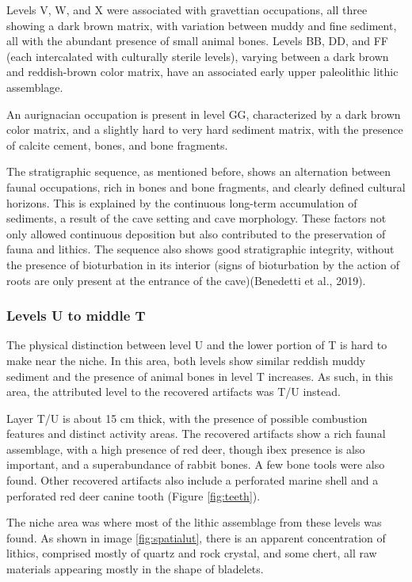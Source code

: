 \documentclass[12pt,twoside]{reedthesis}
\begin{document}
Levels V, W, and X were associated with gravettian occupations, all three showing a dark brown matrix, with variation between muddy and fine sediment, all with the abundant presence of small animal bones. Levels BB, DD, and FF (each intercalated with culturally sterile levels), varying between a dark brown and reddish-brown color matrix, have an associated early upper paleolithic lithic assemblage.

An aurignacian occupation is present in level GG, characterized by a dark brown color matrix, and a slightly hard to very hard sediment matrix, with the presence of calcite cement, bones, and bone fragments.

The stratigraphic sequence, as mentioned before, shows an alternation between faunal occupations, rich in bones and bone fragments, and clearly defined cultural horizons. This is explained by the continuous long-term accumulation of sediments, a result of the cave setting and cave morphology. These factors not only allowed continuous deposition but also contributed to the preservation of fauna and lithics. The sequence also shows good stratigraphic integrity, without the presence of bioturbation in its interior (signs of bioturbation by the action of roots are only present at the entrance of the cave)(Benedetti et al., 2019).

\hypertarget{levels-u-to-middle-t}{%
\subsubsection{Levels U to middle T}\label{levels-u-to-middle-t}}

The physical distinction between level U and the lower portion of T is hard to make near the niche. In this area, both levels show similar reddish muddy sediment and the presence of animal bones in level T increases. As such, in this area, the attributed level to the recovered artifacts was T/U instead.

Layer T/U is about 15 cm thick, with the presence of possible combustion features and distinct activity areas. The recovered artifacts show a rich faunal assemblage, with a high presence of red deer, though ibex presence is also important, and a superabundance of rabbit bones. A few bone tools were also found. Other recovered artifacts also include a perforated marine shell and a perforated red deer canine tooth (Figure \ref{fig:teeth}).

The niche area was where most of the lithic assemblage from these levels was found. As shown in image \ref{fig:spatialut}, there is an apparent concentration of lithics, comprised mostly of quartz and rock crystal, and some chert, all raw materials appearing mostly in the shape of bladelets.
\end{document}
